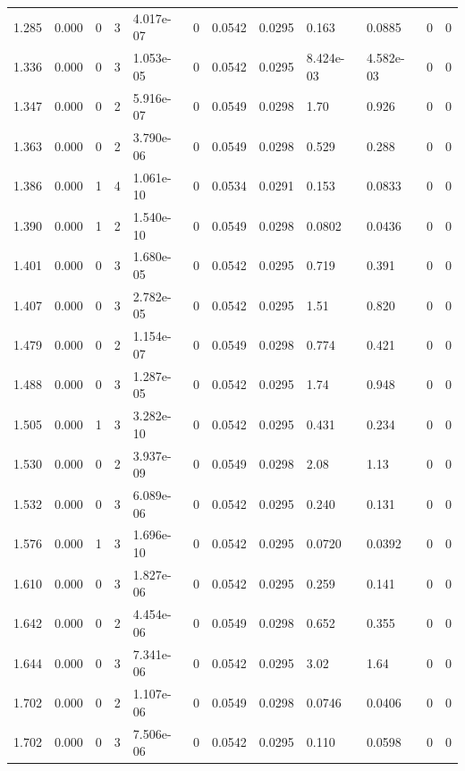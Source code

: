 \documentclass[preview]{standalone}
\begin{document}
{{{\begin{tabular}{L{1.2cm}C{1.2cm} C{0.3cm}C{0.5cm} C{1.4cm}C{1.4cm} C{1.4cm}C{1.4cm} C{1.6cm}C{1.6cm} C{1.6cm}C{1.6cm}}
  1.285  &  0.000  & 0     &  3 &  4.017e-07  & 0  &  0.0542&   0.0295& 0.163 & 0.0885   &  0 & 0  \\ 
  1.336  &  0.000  & 0     &  3 &  1.053e-05  & 0  &  0.0542&   0.0295& 8.424e-03 & 4.582e-03   &  0 & 0  \\ 
  1.347  &  0.000  & 0     &  2 &  5.916e-07  & 0  &  0.0549&   0.0298& 1.70 & 0.926   &  0 & 0  \\ 
  1.363  &  0.000  & 0     &  2 &  3.790e-06  & 0  &  0.0549&   0.0298& 0.529 & 0.288   &  0 & 0  \\ 
  1.386  &  0.000  & 1     &  4 &  1.061e-10  & 0  &  0.0534&   0.0291& 0.153 & 0.0833   &  0 & 0  \\ 
  1.390  &  0.000  & 1     &  2 &  1.540e-10  & 0  &  0.0549&   0.0298& 0.0802 & 0.0436   &  0 & 0  \\ 
  1.401  &  0.000  & 0     &  3 &  1.680e-05  & 0  &  0.0542&   0.0295& 0.719 & 0.391   &  0 & 0  \\ 
  1.407  &  0.000  & 0     &  3 &  2.782e-05  & 0  &  0.0542&   0.0295& 1.51 & 0.820   &  0 & 0  \\ 
  1.479  &  0.000  & 0     &  2 &  1.154e-07  & 0  &  0.0549&   0.0298& 0.774 & 0.421   &  0 & 0  \\ 
  1.488  &  0.000  & 0     &  3 &  1.287e-05  & 0  &  0.0542&   0.0295& 1.74 & 0.948   &  0 & 0  \\ 
  1.505  &  0.000  & 1     &  3 &  3.282e-10  & 0  &  0.0542&   0.0295& 0.431 & 0.234   &  0 & 0  \\ 
  1.530  &  0.000  & 0     &  2 &  3.937e-09  & 0  &  0.0549&   0.0298& 2.08 & 1.13   &  0 & 0  \\ 
  1.532  &  0.000  & 0     &  3 &  6.089e-06  & 0  &  0.0542&   0.0295& 0.240 & 0.131   &  0 & 0  \\ 
  1.576  &  0.000  & 1     &  3 &  1.696e-10  & 0  &  0.0542&   0.0295& 0.0720 & 0.0392   &  0 & 0  \\ 
  1.610  &  0.000  & 0     &  3 &  1.827e-06  & 0  &  0.0542&   0.0295& 0.259 & 0.141   &  0 & 0  \\ 
  1.642  &  0.000  & 0     &  2 &  4.454e-06  & 0  &  0.0549&   0.0298& 0.652 & 0.355   &  0 & 0  \\ 
  1.644  &  0.000  & 0     &  3 &  7.341e-06  & 0  &  0.0542&   0.0295& 3.02 & 1.64   &  0 & 0  \\ 
  1.702  &  0.000  & 0     &  2 &  1.107e-06  & 0  &  0.0549&   0.0298& 0.0746 & 0.0406   &  0 & 0  \\ 
  1.702  &  0.000  & 0     &  3 &  7.506e-06  & 0  &  0.0542&   0.0295& 0.110 & 0.0598   &  0 & 0  \\ 

\end{tabular}}}}
\end{document}
